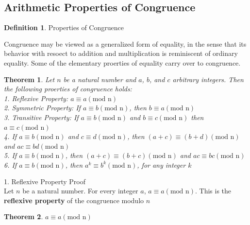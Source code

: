 \documentclass{book}
\newtheorem{theorem}{Theorem}[section]
\theoremstyle{definition}
\newtheorem{definition}{Definition}[section]
\theoremstyle{remark}
\begin{document}
\newpage
\subsection{Arithmetic Properties of Congruence}
\begin{definition}
Properties of Congruence

Congruence may be viewed as a generalized form of equality, in the sense that its behavior with resoect to addition and multiplication is reminiscent of ordinary equality. Some of the elementary proerties of equality carry over to congruence. 

\begin{tcolorbox}
	\begin{theorem}
		Let $n$ be a natural number and $a$, $b$, and $c$ arbitrary integers. Then the following proerties of congruence holds: \\
		1. Reflexive Property: $a \equiv a (\text{mod n})$ \\
		2. Symmetric Property: If $a \equiv b (\text{mod n})$, then $b \equiv a (\text{mod n})$ \\
		3. Transitive Property: If $a \equiv b (\text{mod n})$ and $b \equiv c (\text{mod n})$ then $a \equiv c (\text{mod n})$ \\
		4. If $a \equiv b (\text{mod n})$ and $c \equiv d (\text{mod n})$, then $(a + c) \equiv (b + d) (\text{mod n})$ and $ac \equiv bd (\text{mod n})$ \\
		5. If $a \equiv b (\text{mod n})$, then $(a + c) \equiv (b + c) (\text{mod n})$ and $ac \equiv bc (\text{mod n})$ \\
		6. If $a \equiv b (\text{mod n})$, then $a^k \equiv b^k (\text{mod n})$, for any integer $k$ \\
		
	\end{theorem}
\end{tcolorbox}













1. Reflexive Property Proof \\
Let $n$ be a natural number. For every integer $a$, $a \equiv a (\text{mod n})$. This is the {\bf reflexive  property} of the congruence modulo $n$

\begin{tcolorbox}
	\begin{theorem}
		$a \equiv a (\text{mod n})$
	\end{theorem}
\end{tcolorbox}


\end{definition}
\end{document}
